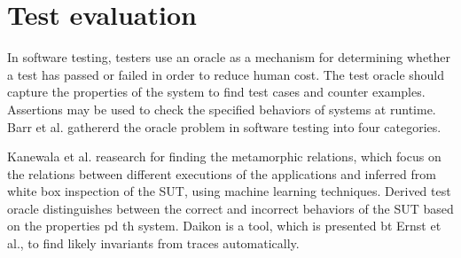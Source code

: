 
\section{Test evaluation}
	
In software testing, testers use an oracle as a mechanism for determining whether a test has passed or failed
in order to reduce human cost.
The test oracle should capture the properties of the system to find test cases and counter examples.
Assertions may be used to check the specified behaviors of systems at runtime.
Barr et al.\cite{OracleProblem} gathererd the oracle problem in software testing into four categories.

Kanewala et al.\cite{DetectMetamorphic} reasearch for finding the metamorphic relations, 
which focus on the relations between different executions of the applications and inferred from white box inspection of the SUT,
using machine learning techniques.
Derived test oracle distinguishes between the correct and incorrect behaviors of the SUT based on the properties pd th system.
Daikon is a tool, which is presented bt Ernst et al.\cite{SupportProgramEvolution}, 
to find likely invariants from traces automatically.


